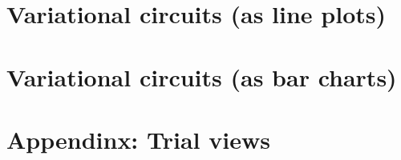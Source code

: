 \documentclass{article}
\newcommand{\SYSHASH}{628f56}
\newcommand{\TAG}{1003}
\newcommand{\bmimage}[1]{
    \begin{center}
    
    \end{center}}
\begin{document}
\bmimage{deep_compile}

\bmimage{deep_runtime}

\pagebreak
\section{Variational circuits (as line plots)}

\bmimage{variational_compile_adjoint_lineplot}

\bmimage{variational_compile_backprop_lineplot}

\bmimage{variational_compile_finitediff_lineplot}

\bmimage{variational_compile_parametershift_lineplot}

\pagebreak

\bmimage{variational_runtime_adjoint_lineplot}

\bmimage{variational_runtime_backprop_lineplot}

\bmimage{variational_runtime_finitediff_lineplot}

\bmimage{variational_runtime_parametershift_lineplot}

\pagebreak
\section{Variational circuits (as bar charts)}

\bmimage{variational_runtime_adjoint}

\bmimage{variational_runtime_backprop}

\bmimage{variational_runtime_finitediff}

\bmimage{variational_runtime_parametershift}

\pagebreak
\section{Appendinx: Trial views}

\bmimage{regular_compile_trial}

\bmimage{regular_runtime_trial}

\bmimage{deep_compile_trial}

\bmimage{deep_runtime_trial}

\bmimage{variational_compile_trial_adjoint_lineplot}

\bmimage{variational_compile_trial_backprop_lineplot}

\bmimage{variational_compile_trial_finitediff_lineplot}

\bmimage{variational_compile_trial_parametershift_lineplot}

\bmimage{variational_runtime_trial_adjoint_backprop_lineplot}

\bmimage{variational_runtime_trial_finitediff_lineplot}

\bmimage{variational_runtime_trial_parametershift_lineplot}
\end{document}
